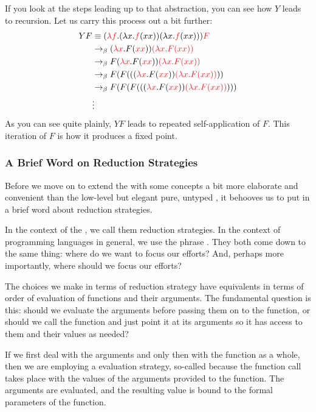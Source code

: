 If you look at the steps leading up to that abstraction, you can see how $Y$ leads to recursion. Let us carry this process out a bit further:
\begin{align*}
Y F &\equiv (\redex{\lambda f}. (\lambda x.\redex{f}(xx))(\lambda x.\redex{f}(xx))) \redex{F} \\
&\betared (\redex{\lambda x}. F(\redex{x}\redex{x})) \redex{(\lambda x. F(xx))}\\
&\betared F (\redex{\lambda x}. F(\redex{x}\redex{x})) \redex{(\lambda x. F(xx))}\\
&\betared F ( F ( ((\redex{\lambda x}. F(\redex{x}\redex{x})) \redex{(\lambda x. F(xx))} ))\\
&\betared F ( F ( F ( ((\redex{\lambda x}. F(\redex{x}\redex{x})) \redex{(\lambda x. F(xx))} )))\\
&\vdots
\end{align*}
As you can see quite plainly, $YF$ leads to repeated self-application of $F$. This iteration of $F$ is how it produces a fixed point.%

\subsubsection{A Brief Word on Reduction Strategies}\label{untyped:strategies}
Before we move on to extend the \lambdacalc with some concepts a bit more elaborate and convenient than the low-level but elegant pure, untyped \lambdacalc{}, it behooves us to put in a brief word about reduction strategies.

In the context of the \lambdacalc{}, we call them reduction strategies. In the context of programming languages in general, we use the phrase . They both come down to the same thing: where do we want to focus our efforts? And, perhaps more importantly, where should we focus our efforts? 

The choices we make in terms of \lambdacalc reduction strategy have equivalents in terms of order of evaluation of functions and their arguments. The fundamental question is this: should we evaluate the arguments before passing them on to the function, or should we call the function and just point it at its arguments so it has access to them and their values as needed?

If we first deal with the arguments and only then with the function as a whole, then we are employing a  evaluation strategy, so-called because the function call takes place with the values of the arguments provided to the function. The arguments are evaluated, and the resulting value is bound to the formal parameters of the function.

